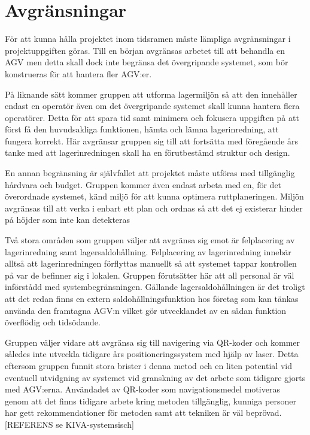 \documentclass[a4paper,11pt]{article}
\begin{document}
\section{Avgränsningar}

För att kunna hålla projektet inom tidsramen måste lämpliga avgränsningar i
projektuppgiften göras. Till en början avgränsas arbetet till att behandla
en AGV men detta skall dock inte begränsa det övergripande systemet, som
bör konstrueras för att hantera fler AGV:er.

På liknande sätt kommer gruppen att utforma lagermiljön så att den
innehåller endast en operatör även om det övergripande systemet skall kunna
hantera flera operatörer. Detta för att spara tid samt minimera och
fokusera uppgiften på att först få den huvudsakliga funktionen, hämta och
lämna lagerinredning, att fungera korrekt. Här avgränsar gruppen sig till
att fortsätta med föregående års tanke med att lagerinredningen skall ha en
förutbestämd struktur och design.

En annan begränsning är självfallet att projektet måste utföras med
tillgänglig hårdvara och budget. Gruppen kommer även endast arbeta med en,
för det överordnade systemet, känd miljö för att kunna optimera
ruttplaneringen. Miljön avgränsas till att verka i enbart ett plan och
ordnas så att det ej existerar hinder på höjder som inte kan detekteras

Två stora områden som gruppen väljer att avgränsa sig emot är felplacering
av lagerinredning samt lagersaldohållning. Felplacering av lagerinredning
innebär alltså att lagerinredningen förflyttas manuellt så att systemet
tappar kontrollen på var de befinner sig i lokalen. Gruppen förutsätter här
att all personal är väl införstådd med systembegränsningen. Gällande
lagersaldohållningen är det troligt att det redan finns en extern
saldohållningsfunktion hos företag som kan tänkas använda den framtagna
AGV:n vilket gör utvecklandet av en sådan funktion överflödig och
tidsödande.

Gruppen väljer vidare att avgränsa sig till navigering via QR-koder och
kommer således inte utveckla tidigare års positioneringssystem med hjälp av
laser. Detta eftersom gruppen funnit stora brister i denna metod och en
liten potential vid eventuell utvidgning av systemet vid granskning av det
arbete som tidigare gjorts med AGV:erna. Användadet av QR-koder som
navigationsmedel motiveras genom att det finns tidigare arbete kring
metoden tillgänglig, kunniga personer har gett rekommendationer för metoden
samt att tekniken är väl beprövad. [REFERENS se KIVA-systemsisch]
\end{document}
